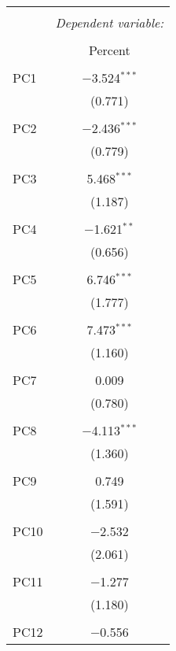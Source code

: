 
\begin{table}[!htbp] \centering 
  \caption{} 
  \label{} 
\begin{tabular}{@{\extracolsep{5pt}}lc} 
\\[-1.8ex]\hline 
\hline \\[-1.8ex] 
 & \multicolumn{1}{c}{\textit{Dependent variable:}} \\ 
\cline{2-2} 
\\[-1.8ex] & Percent \\ 
\hline \\[-1.8ex] 
 PC1 & $-$3.524$^{***}$ \\ 
  & (0.771) \\ 
  & \\ 
 PC2 & $-$2.436$^{***}$ \\ 
  & (0.779) \\ 
  & \\ 
 PC3 & 5.468$^{***}$ \\ 
  & (1.187) \\ 
  & \\ 
 PC4 & $-$1.621$^{**}$ \\ 
  & (0.656) \\ 
  & \\ 
 PC5 & 6.746$^{***}$ \\ 
  & (1.777) \\ 
  & \\ 
 PC6 & 7.473$^{***}$ \\ 
  & (1.160) \\ 
  & \\ 
 PC7 & 0.009 \\ 
  & (0.780) \\ 
  & \\ 
 PC8 & $-$4.113$^{***}$ \\ 
  & (1.360) \\ 
  & \\ 
 PC9 & 0.749 \\ 
  & (1.591) \\ 
  & \\ 
 PC10 & $-$2.532 \\ 
  & (2.061) \\ 
  & \\ 
 PC11 & $-$1.277 \\ 
  & (1.180) \\ 
  & \\ 
 PC12 & $-$0.556 \\ 

\end{tabular}
\end{table}
